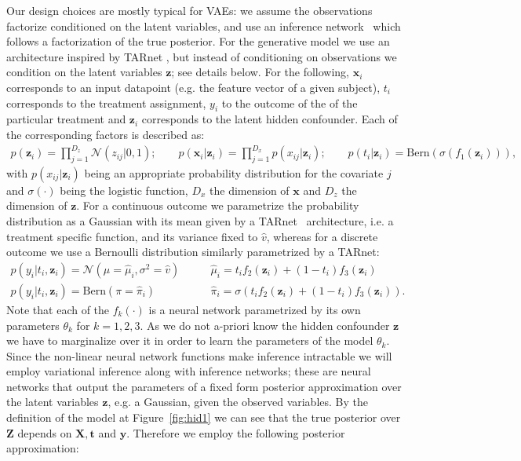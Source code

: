 \documentclass{article}
\def\*#1{\mathbf{#1}}
\begin{document}
Our design choices are mostly typical for VAEs: we assume the observations factorize conditioned on the latent variables, and use an inference network~\citep{kingma2013auto,rezende2014stochastic} which follows a factorization of the true posterior. For the generative model we use an architecture inspired by TARnet \citep{shalit2016estimating}, but instead of conditioning on observations we condition on the latent variables $\*z$; see details below.
For the following, $\*x_i$ corresponds to an input datapoint (e.g. the feature vector of a given subject), $t_i$ corresponds to the treatment assignment, $y_i$ to the outcome of the of the particular treatment and $\*z_i$ corresponds to the latent hidden confounder. Each of the corresponding factors is described as:
\begin{align}
p(\*z_i) = \prod_{j=1}^{D_z}\mathcal{N}(z_{ij}| 0, 1);\qquad
p(\*x_i|\*z_i) = \prod_{j=1}^{D_x}p(x_{ij}| \*z_i);\qquad
p(t_i|\*z_i) = \text{Bern}(\sigma(f_1(\*z_i))),
\end{align}
with $p(x_{ij}|\*z_i)$ being an appropriate probability distribution for the covariate $j$ and $\sigma(\cdot)$ being the logistic function, $D_x$ the dimension of $\*x$ and $D_z$ the dimension of $\*z$. For a continuous outcome we parametrize the probability distribution as a Gaussian with its mean given by a TARnet~\citep{shalit2016estimating} architecture, i.e. a treatment specific function, and its variance fixed to $\hat{v}$, whereas for a discrete outcome we use a Bernoulli distribution similarly parametrized by a TARnet:
\begin{align}
p(y_i|t_i, \*z_i) = \mathcal{N}(\mu=\hat{\mu}_i, \sigma^2=\hat{v})&\qquad
\hat{\mu}_i = t_i f_2(\*z_i) + (1 - t_i)f_3(\*z_i)\\
p(y_i|t_i, \*z_i) = \text{Bern}(\pi=\hat{\pi}_i)&\qquad
\hat{\pi}_i = \sigma(t_i f_2(\*z_i) + (1 - t_i)f_3(\*z_i)).
\end{align}
Note that each of the $f_k(\cdot)$ is a neural network parametrized by its own parameters $\theta_k$ for $k=1,2,3$. As we do not a-priori know the hidden confounder $\*z$ we have to marginalize over it in order to learn the parameters of the model $\theta_k$. Since the non-linear neural network functions make inference intractable we will employ variational inference along with inference networks; these are neural networks that output the parameters of a fixed form posterior approximation over the latent variables $\*z$, e.g. a Gaussian, given the observed variables. By the definition of the model at Figure~\ref{fig:hid1} we can see that the true posterior over $\*Z$ depends on $\*X,\*t$ and $\*y$. Therefore we employ the following posterior approximation:
\end{document}
